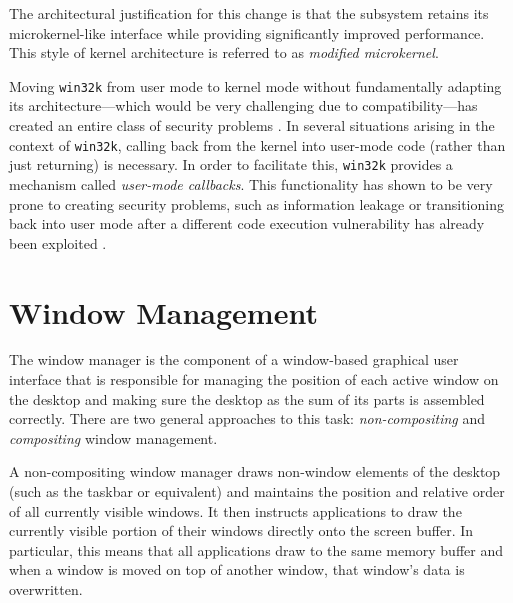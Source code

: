 			The architectural justification for this change is that the
			subsystem retains its microkernel-like interface while providing
			significantly improved performance. This style of kernel
			architecture is referred to as \emph{modified microkernel}.
			\cite{gdikernel}

			Moving \texttt{win32k} from user mode to kernel mode without
			fundamentally adapting its architecture---which would be very
			challenging due to compatibility---has created an entire class of
			security problems \cite{mandy2011kernel}.  In several situations arising in the context of
			\texttt{win32k}, calling back from the kernel into user-mode code
			(rather than just returning) is necessary. In order to facilitate
			this, \texttt{win32k} provides a mechanism called \textit{user-mode
			callbacks}. This functionality has shown to be very prone to
			creating security problems, such as information leakage or
			transitioning back into user mode after a different code execution
			vulnerability has already been exploited \cite{mandy2011kernel}.

	\section{Window Management}\label{sec:wm}
			The window manager is the component of a window-based graphical user
			interface that is responsible for managing the position of each active
			window on the desktop and making sure the desktop as the sum of its
			parts is assembled correctly. There are two general approaches to this
			task: \emph{non-compositing} and \emph{compositing} window management.

			A non-compositing window manager draws non-window elements of the
			desktop (such as the taskbar or equivalent) and maintains the
			position and relative order of all currently visible windows. It
			then instructs applications to draw the currently visible portion
			of their windows directly onto the screen buffer. In particular,
			this means that all applications draw to the same memory buffer and
			when a window is moved on top of another window, that window's data
			is overwritten.

